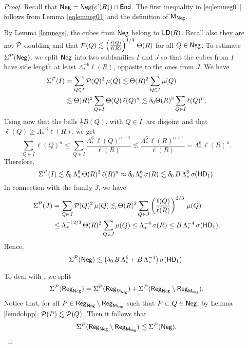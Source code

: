 \begin{proof}
Recall that ${\mathsf{Neg}} = {\mathsf{Neg}}(e'(R))\cap{\mathsf{End}}$. The first inequality in \eqref{eqlemneg01} follows from Lemma \ref{eqlemneg01} and the definition of ${\mathsf{M}}_{\mathsf{Neg}}$. 

By Lemma \ref{lemnegs}, the cubes from ${\mathsf{Neg}}$ belong to ${\mathsf{LD}}(R)$. Recall also they are not ${\mathcal P}$-doubling and that ${\mathcal P}(Q)\lesssim \left(\frac{\ell(Q)}{\ell(R)}\right)^{1/3}\,\Theta(R)$ for all $Q\in{\mathsf{Neg}}$.
To estimate $\Sigma^{\mathcal P}({\mathsf{Neg}})$, we split ${\mathsf{Neg}}$ into two subfamilies $I$ and $J$ so that the 
cubes from $I$ have side length at least $\Lambda_*^{-6}\ell(R)$, opposite to the ones from $J$. We have
\begin{align*}
\Sigma^{\mathcal P}(I) &= \sum_{Q\in I}{\mathcal P}(Q)^2\,\mu(Q) \lesssim \Theta(R)^2\sum_{Q\in I}\mu(Q)\\
& \lesssim \Theta(R)^2\sum_{Q\in I}\Theta(Q)\,\ell(Q)^n \lesssim \delta_0\Theta(R)^3\sum_{Q\in I}\ell(Q)^n.
\end{align*}
Using now that the balls $\frac12B(Q)$, with $Q\in I$, are disjoint and that $\ell(Q)\geq \Lambda_*^{-6}\ell(R)$, we get
$$\sum_{Q\in I}\ell(Q)^n \leq \sum_{Q\in I}\frac{\Lambda_*^6\,\ell(Q)^{n+1} }{\ell(R)}\lesssim
\frac{\Lambda_*^6\,\ell(R)^{n+1} }{\ell(R)}=\Lambda_*^6\,\ell(R)^n.$$
Therefore,
$$\Sigma^{\mathcal P}(I)\lesssim \delta_0\,\Lambda_*^6\,\Theta(R)^3\,\ell(R)^n\approx  \delta_0\,\Lambda_*^6\,\sigma(R)\lesssim \delta_0\,B\,\Lambda_*^6\,\sigma({\mathsf{HD}}_1).$$
In connection with the family $J$, we have
\begin{align*}
\Sigma^{\mathcal P}(J) &= \sum_{Q\in J}{\mathcal P}(Q)^2\,\mu(Q)\lesssim \Theta(R)^2\sum_{Q\in J}\left(\frac{\ell(Q)}{\ell(R)}\right)^{2/3}\,\mu(Q)\\
&\leq \Lambda_*^{-12/3}\,\Theta(R)^2\sum_{Q\in J}\mu(Q) \leq \Lambda_*^{-4}\,\sigma(R)\leq B\,\Lambda_*^{-4}\,\sigma({\mathsf{HD}}_1).
\end{align*}
Hence,
$$\Sigma^{\mathcal P}({\mathsf{Neg}})\lesssim \big(\delta_0\,B\,\Lambda_*^6 + B\,\Lambda_*^{-4}\big)\,\sigma({\mathsf{HD}}_1).$$

\vv
To deal with , we split
$$\Sigma^{\mathcal P}({\mathsf{Reg}}_{\mathsf{Neg}}) = \Sigma^{\mathcal P}({\mathsf{Reg}}_{{\mathsf{M}}_{\mathsf{Neg}}}) + \Sigma^{\mathcal P}({\mathsf{Reg}}_{\mathsf{Neg}}\setminus {\mathsf{Reg}}_{{\mathsf{M}}_{\mathsf{Neg}}}).$$
Notice that, for all $P\in{\mathsf{Reg}}_{\mathsf{Neg}}\setminus {\mathsf{Reg}}_{{\mathsf{M}}_{\mathsf{Neg}}}$ such that $P\subset Q\in{\mathsf{Neg}}$, by Lemma \ref{lemdobpp}, 
${\mathcal P}(P)\lesssim{\mathcal P}(Q)$. Then it follows that
$$\Sigma^{\mathcal P}({\mathsf{Reg}}_{\mathsf{Neg}}\setminus {\mathsf{Reg}}_{{\mathsf{M}}_{\mathsf{Neg}}})\lesssim \Sigma^{\mathcal P}({\mathsf{Neg}}).$$


\end{proof}
